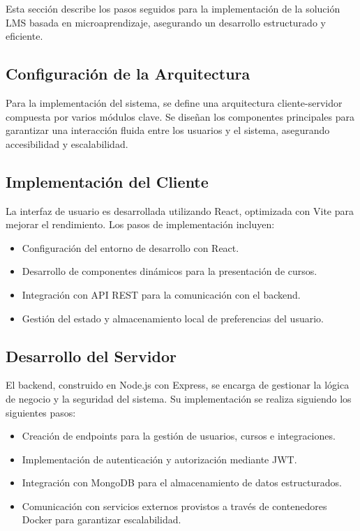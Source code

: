 Esta sección describe los pasos seguidos para la implementación de la solución
LMS basada en microaprendizaje, asegurando un desarrollo estructurado y
eficiente.  

\subsection{Configuración de la Arquitectura}  
Para la implementación del sistema, se define una arquitectura cliente-servidor
compuesta por varios módulos clave. Se diseñan los componentes principales
para garantizar una interacción fluida entre los usuarios y el sistema,
asegurando accesibilidad y escalabilidad.  

\subsection{Implementación del Cliente}  
La interfaz de usuario es desarrollada utilizando React, optimizada
con Vite para mejorar el rendimiento. Los pasos de implementación
incluyen:  

\begin{itemize}  
    \item Configuración del entorno de desarrollo con React.  
    \item Desarrollo de componentes dinámicos para la presentación de cursos.  
    \item Integración con API REST para la comunicación con el backend.  
    \item Gestión del estado y almacenamiento local de preferencias del usuario.  
\end{itemize}  

\subsection{Desarrollo del Servidor}  
El backend, construido en Node.js con Express, se encarga de gestionar
la lógica de negocio y la seguridad del sistema. Su implementación se realiza
siguiendo los siguientes pasos:  

\begin{itemize}  
    \item Creación de endpoints para la gestión de usuarios, cursos e
    integraciones.  
    \item Implementación de autenticación y autorización mediante JWT.  
    \item Integración con MongoDB para el almacenamiento de datos estructurados.  
    \item Comunicación con servicios externos provistos a través de contenedores
    Docker para garantizar escalabilidad.  
\end{itemize}  

